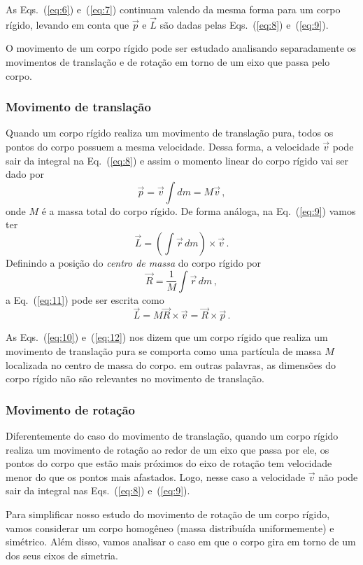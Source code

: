 \documentclass[twocolumn=on,DIV=calc]{scrartcl}
\newcommand{\dpar}[1]{\left(#1\right)}
\theoremstyle{definition}
\begin{document}
As Eqs.~(\ref{eq:6}) e~(\ref{eq:7}) continuam valendo da mesma
forma para um corpo rígido, levando em conta que $\vec p$ e $\vec L$
são dadas pelas Eqs.~(\ref{eq:8}) e~(\ref{eq:9}).

O movimento de um corpo rígido pode ser estudado analisando
separadamente os movimentos de translação e de rotação em torno de um
eixo que passa pelo corpo.

\subsubsection{Movimento de translação}
Quando um corpo rígido realiza um movimento de translação pura, todos
os pontos do corpo possuem a mesma velocidade. Dessa forma, a
velocidade $\vec v$ pode sair da integral na Eq.~(\ref{eq:8}) e assim o momento
linear do corpo rígido vai ser dado por
\begin{equation}
  \label{eq:10}
  \vec p=\vec v\int dm=M\vec v\,,
\end{equation}
onde $M$ é a massa total do corpo rígido. De forma análoga, na
Eq.~(\ref{eq:9}) vamos ter
\begin{equation}
  \label{eq:11}
  \vec L=\dpar{\int \vec r\,dm}\times\vec v\,.
\end{equation}
Definindo a posição do \textit{centro de massa} do corpo rígido por
$$\vec R=\frac{1}{M}\int \vec r\,dm\,,$$
a Eq.~(\ref{eq:11}) pode ser escrita como
\begin{equation}
  \label{eq:12}
  \vec L=M\vec R\times\vec v=\vec R\times\vec p\,.
\end{equation}

As Eqs.~(\ref{eq:10}) e~(\ref{eq:12}) nos dizem que um corpo rígido
que realiza um movimento de translação pura se comporta como uma
partícula de massa $M$ localizada no centro de massa do corpo. em
outras palavras, as dimensões do corpo rígido não são relevantes no
movimento de translação.

\subsubsection{Movimento de rotação}
Diferentemente do caso do movimento de translação, quando um corpo
rígido realiza um movimento de rotação ao redor de um eixo que passa
por ele, os pontos do corpo que estão mais próximos do eixo de rotação
tem velocidade menor do que os pontos mais afastados. Logo, nesse caso
a velocidade $\vec v$ não pode sair da integral nas Eqs.~(\ref{eq:8})
e~(\ref{eq:9}).

Para simplificar nosso estudo do movimento de rotação de um corpo
rígido, vamos considerar um corpo homogêneo (massa distribuída
uniformemente) e simétrico. Além disso, vamos analisar o caso em que o
corpo gira em torno de um dos seus eixos de simetria.
\end{document}
